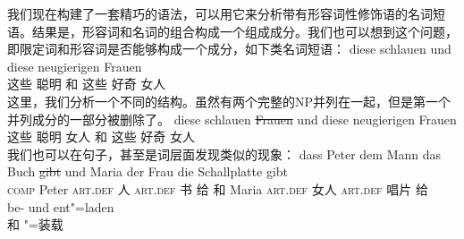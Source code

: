 我们现在构建了一套精巧的语法，可以用它来分析带有形容词性修饰语的名词短语。结果是，形容词和名词的组合构成一个组成成分。我们也可以想到这个问题，即限定词和形容词是否能够构成一个成分，如下类名词短语：
\ea
\gll diese schlauen und diese neugierigen Frauen\\
	 这些 聪明 和 这些 好奇 女人\\
\z
这里，我们分析一个不同的结构。虽然有两个完整的NP并列在一起，但是第一个并列成分的一部分被删除了。
\ea
\gll diese schlauen \st{Frauen} und diese neugierigen Frauen\\
	  这些 聪明 女人 和 这些 好奇 女人\\
\z
我们也可以在句子，甚至是词层面发现类似的现象：
\eal
\ex 
\gll dass Peter dem Mann das Buch \st{gibt} und Maria der Frau die Schallplatte gibt\\
     \textsc{comp} Peter \textsc{art}.\textsc{def} 人 \textsc{art}.\textsc{def} 书 给 和 Maria \textsc{art}.\textsc{def} 女人 \textsc{art}.\textsc{def} 唱片 给\\
\ex 
\gll be- und ent"=laden\\
	 \prt{} 和 \prt{}"=装载\\
\zl

